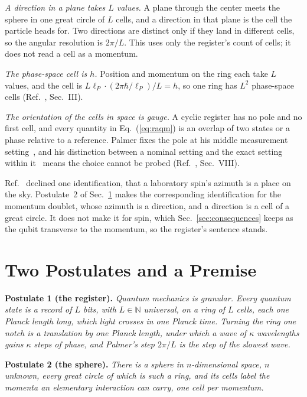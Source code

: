 \documentclass[aps,prd,twocolumn,superscriptaddress,nofootinbib]{revtex4-2}
\begin{document}
\textit{A direction in a plane takes $L$ values.} A plane through the center meets the sphere in one great circle of $L$ cells, and a direction in that plane is the cell the particle heads for. Two directions are distinct only if they land in different cells, so the angular resolution is $2\pi/L$. This uses only the register's count of cells; it does not read a cell as a momentum.

\textit{The phase-space cell is $h$.} Position and momentum on the ring each take $L$ values, and the cell is $L\ell_P\cdot(2\pi\hbar/\ell_P)/L = h$, so one ring has $L^2$ phase-space cells (Ref.~\cite{korytko2026c}, Sec.~III).

\textit{The orientation of the cells in space is gauge.} A cyclic register has no pole and no first cell, and every quantity in Eq.~(\ref{eq:raqm}) is an overlap of two states or a phase relative to a reference. Palmer fixes the pole at his middle measurement setting~\cite{palmer2026c}, and his distinction between a nominal setting and the exact setting within it~\cite{palmer2024} means the choice cannot be probed (Ref.~\cite{korytko2026c}, Sec.~VIII).

Ref.~\cite{korytko2026c} declined one identification, that a laboratory spin's azimuth is a place on the sky. Postulate~2 of Sec.~\ref{sec:postulates} makes the corresponding identification for the momentum doublet, whose azimuth is a direction, and a direction is a cell of a great circle. It does not make it for spin, which Sec.~\ref{sec:consequences} keeps as the qubit transverse to the momentum, so the register's sentence stands.

\section{Two Postulates and a Premise}
\label{sec:postulates}

\textbf{Postulate 1 (the register).} \emph{Quantum mechanics is granular. Every quantum state is a record of $L$ bits, with $L\in\mathbb{N}$ universal, on a ring of $L$ cells, each one Planck length long, which light crosses in one Planck time. Turning the ring one notch is a translation by one Planck length, under which a wave of $\kappa$ wavelengths gains $\kappa$ steps of phase, and Palmer's step $2\pi/L$ is the step of the slowest wave.}

\textbf{Postulate 2 (the sphere).} \emph{There is a sphere in $n$-dimensional space, $n$ unknown, every great circle of which is such a ring, and its cells label the momenta an elementary interaction can carry, one cell per momentum.}
\end{document}
